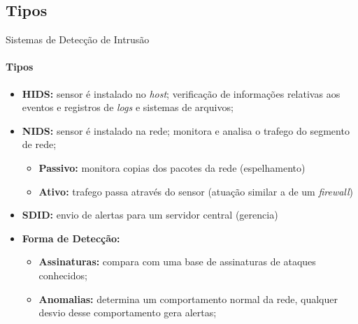 \documentclass[aspectratio=169]{beamer}
\begin{document}
\subsection{Tipos}
\begin{frame}{Sistemas de Detecção de Intrusão}
    \framesubtitle{Tipos}
    \begin{itemize}
        \item \textbf{HIDS:} sensor é instalado no \textit{host}; verificação de informações relativas aos eventos e registros de \textit{logs} e sistemas de arquivos;
        \item \textbf{NIDS:} sensor é instalado na rede; monitora e analisa o trafego do segmento de rede;
            \begin{itemize}
                \item \textbf{Passivo:} monitora copias dos pacotes da rede (espelhamento)
                \item \textbf{Ativo:} trafego passa através do sensor (atuação similar a de um \textit{firewall})
            \end{itemize}
        \item \textbf{SDID:} envio de alertas para um servidor central (gerencia)
        \item \textbf{Forma de Detecção:}
            \begin{itemize}
                \item \textbf{Assinaturas:} compara com uma base de assinaturas de ataques conhecidos;
                \item \textbf{Anomalias:} determina um comportamento normal da rede, qualquer desvio desse comportamento gera alertas;
            \end{itemize}
    \end{itemize}
\end{frame}
\end{document}
